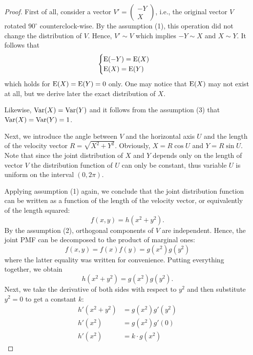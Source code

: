 \begin{proof}
First of all, consider a vector $V' = \begin{pmatrix} -Y \\ X \end{pmatrix}$, i.e.,
the original vector $V$ rotated $90^{\circ}$ counterclock-wise.
By the assumption (1), this operation did not change the distribution of $V$.
Hence, $V' \sim V$ which implies $-Y \sim X$ and $X \sim Y$.
It follows that
\[
\begin{cases}
\operatorname{E}(-Y) = \operatorname{E}(X) \\
\operatorname{E}(X) = \operatorname{E}(Y)
\end{cases}
\]
which holds for $\operatorname{E}(X) = \operatorname{E}(Y) = 0$ only.
One may notice that $\operatorname{E}(X)$ may not exist at all,
but we derive later the exact distribution of $X$.

Likewise, $\operatorname{Var}(X) = \operatorname{Var}(Y)$ and it follows from the assumption (3)
that $\operatorname{Var}(X) = \operatorname{Var}(Y) = 1$.

Next, we introduce the angle between $V$ and the horizontal axis $U$ and
the length of the velocity vector $R = \sqrt{X^2 + Y^2}$.
Obviously, $X = R \cos U$ and $Y = R \sin U$.
Note that since the joint distribution of $X$ and $Y$ depends only on
the length of vector $V$ the distribution function of $U$ can only be constant,
thus variable $U$ is uniform on the interval $(0, 2\pi)$.

Applying assumption (1) again, we conclude that the joint distribution function
can be written as a function of the length of the velocity vector, or equivalently
of the length squared:
\[
f(x,y) = h(x^2 + y^2).
\]
By the assumption (2), orthogonal components of $V$ are independent.
Hence, the joint PMF can be decomposed to the product of marginal ones:
\[
f(x,y) = f(x)f(y) = g(x^2)g(y^2)
\]
where the latter equality was written for convenience.
Putting everything together, we obtain
\[
h(x^2 + y^2) = g(x^2)g(y^2).
\]
Next, we take the derivative of both sides with respect to $y^2$ and
then substitute $y^2 = 0$ to get a constant $k$:
\begin{align*}
h'(x^2 + y^2) &= g(x^2)g'(y^2) \\
h'(x^2) &= g(x^2)g'(0) \\
h'(x^2) &= k \cdot g(x^2)
\end{align*}



\end{proof}
